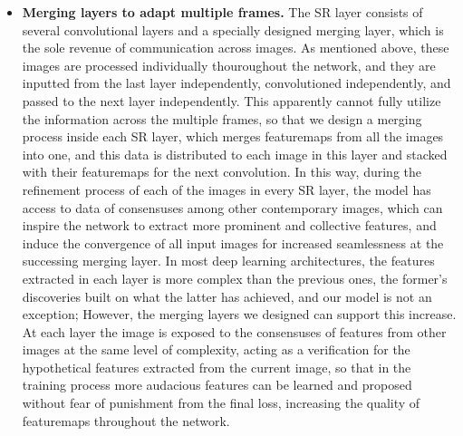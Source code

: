 \begin{itemize}[leftmargin=*]
  \item \textbf{Merging layers to adapt multiple frames.} The SR layer consists of several convolutional layers and a specially designed merging layer, which is the sole revenue of communication across images. As mentioned above, these images are processed individually thouroughout the network, and they are inputted from the last layer independently, convolutioned independently, and passed to the next layer independently. This apparently cannot fully utilize the information across the multiple frames, so that we design a merging process inside each SR layer, which merges featuremaps from all the images into one, and this data is distributed to each image in this layer and stacked with their featuremaps for the next convolution. In this way, during the refinement process of each of the images in every SR layer, the model has access to data of consensuses among other contemporary images, which can inspire the network to extract more prominent and collective features, and induce the convergence of all input images for increased seamlessness at the successing merging layer. In most deep learning architectures, the features extracted in each layer is more complex than the previous ones, the former's discoveries built on what the latter has achieved, and our model is not an exception; However, the merging layers we designed can support this increase. At each layer the image is exposed to the consensuses of features from other images at the same level of complexity, acting as a verification for the hypothetical features extracted from the current image, so that in the training process more audacious features can be learned and proposed without fear of punishment from the final loss, increasing the quality of featuremaps throughout the network.

\end{itemize}
